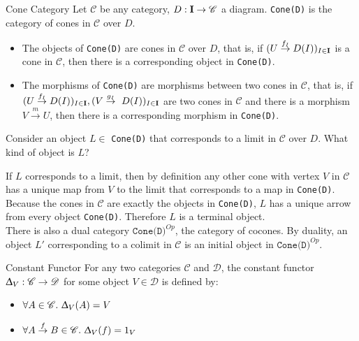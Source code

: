 \begin{definition}
  {Cone Category}
  Let $\mathscr{C}$ be any category, $D : \bf{I} \to \mathscr{C}$ a diagram.
  \texttt{Cone(D)} is the category of cones in $\mathscr{C}$ over $D$.
  \begin{itemize}
  \item The objects of \texttt{Cone(D)} are cones in $\mathscr{C}$ over $D$, that is, if
    $(U \overset{f_I}{\to} D(I))_{I \in \bf{I}}$ is a cone in $\mathscr{C}$, then there is a corresponding object
    in \texttt{Cone(D)}.
  \item The morphisms of \texttt{Cone(D)} are morphisms between two cones in $\mathscr{C}$, that is,
    if $(U \overset{f_I}{\to} D(I))_{I \in \bf{I}}, (V \overset{g_I}{\to}~ D(I))_{I \in \bf{I}}$
    are two cones in $\mathscr{C}$ and there is a morphism $V \overset{m}{\to} U$, then there
    is a corresponding morphism in \texttt{Cone(D)}.
  \end{itemize}
\end{definition}

\begin{exercise}
  Consider an object $L \in$ \texttt{Cone(D)} that corresponds to a limit in $\mathscr{C}$ over $D$.
  What kind of object is $L$?\\
\end{exercise}
\begin{answer}
  If $L$ corresponds to a limit, then by definition any other cone with vertex $V$ in $\mathscr{C}$ has a unique map
  from $V$ to the limit that corresponds to a map in \texttt{Cone(D)}.
  Because the cones in $\mathscr{C}$ are exactly the objects in \texttt{Cone(D)},
  $L$ has a unique arrow from every object \texttt{Cone(D)}.
  Therefore $L$ is a terminal object.\\
  There is also a dual category $\texttt{Cone(D)}^{Op}$, the category of cocones. By duality,
  an object $L'$ corresponding to a colimit in $\mathscr{C}$ is an initial object in $\texttt{Cone(D)}^{Op}$.
\end{answer}

\begin{definition}
  {Constant Functor}
  For any two categories $\mathscr{C}$ and $\mathscr{D}$,
  the constant functor $\Updelta _ V : \mathscr{C} \to \mathscr{D} $ for some object $V \in \mathscr{D}$
  is defined by:
  \begin{itemize}
    \item $\forall A \in \mathscr{C}. \ \Updelta _ V (A) = V$
    \item $\forall A \overset{f}{\to} B \in \mathscr{C}. \ \Updelta _ V (f) = 1_V$
  \end{itemize}
  
\end{definition}

